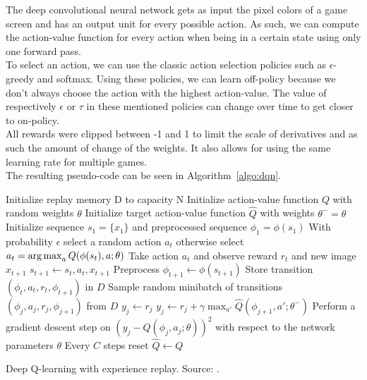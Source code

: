 The deep convolutional neural network gets as input the pixel colors of a game screen and has an output unit for every possible action. As such, we can compute the action-value function for every action when being in a certain state using only one forward pass.\\

To select an action, we can use the classic action selection policies such as $\epsilon$-greedy and softmax. Using these policies, we can learn off-policy because we don't always choose the action with the highest action-value. The value of respectively $\epsilon$ or $\tau$ in these mentioned policies can change over time to get closer to on-policy.\\

All rewards were clipped between -1 and 1 to limit the scale of derivatives and as such the amount of change of the weights. It also allows for using the same learning rate for multiple games.\\
The resulting pseudo-code can be seen in Algorithm~\ref{algo:dqn}.\\
\begin{algorithm}[htb]
\DontPrintSemicolon
Initialize replay memory D to capacity N\;
Initialize action-value function $Q$ with random weights $\theta$\;
Initialize target action-value function $\hat{Q}$ with weights $\theta^- = \theta$\;
 {
    Initialize sequence $s_1 = \{x_1\}$ and preprocessed sequence $\phi_1 = \phi(s_1)$\;
     {
        With probability $\epsilon$ select a random action $a_t$\;
        otherwise select $a_t = \operatorname*{arg\,max}_a Q(\phi(s_t),a;\theta)$\;
        Take action $a_t$ and observe reward $r_t$ and new image $x_{t+1}$\;
        $s_{t+1} \gets s_t,a_t,x_{t+1}$\;
        Preprocess $\phi_{t+1} \gets \phi(s_{t+1})$\;
        Store transition $(\phi_t,a_t,r_t,\phi_{t+1})$ in $D$\;
        Sample random minibatch of transitions $(\phi_j,a_j,r_j,\phi_{j+1})$ from $D$\;
         {
            $y_j \gets r_j$\;
        }{
            $y_j \gets r_j + \gamma \max_{a'} \hat{Q}(\phi_{j+1},a';\theta^-)$\;
        }
        Perform a gradient descent step on $(y_j - Q(\phi_j,a_j;\theta))^2$ with respect to the network parameters $\theta$\;
        Every $C$ steps reset $\hat{Q} \gets Q$\;
    }
}
\caption[Deep Q-learning with experience replay]{Deep Q-learning with experience replay. Source: \cite{mnih2013playing}.}
\label{algo:dqn}
\end{algorithm}

